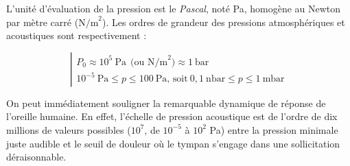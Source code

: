 
L'unité d'évaluation de la pression est le \emph{Pascal}, noté Pa,
homogène au Newton par mètre carré ($\mbox{N/m}^{2}$).
Les ordres de grandeur des pressions atmosphériques et acoustiques sont respectivement :

\vspace{-.75\baselineskip}
\begin{equation}
\left |
\begin{array}{l}
P_{0} \approx 10^{5} ~\mbox{Pa} ~~\mbox{(ou N/m}^{2}) \approx 1 ~\mbox{bar} \\[1ex]
10^{-5} ~\mbox{Pa} \leq p \leq 100 ~\mbox{Pa} \mbox{, soit} ~ 0,1~\mbox{nbar} \leq p \leq 1~\mbox{mbar}
\end{array}
\right.
\label{eq:V.2}
\end{equation}
\vspace{-.75\baselineskip}

On peut immédiatement souligner la remarquable dynamique de réponse de l'oreille humaine. En effet, l'échelle de pression acoustique est de l'ordre de dix millions de valeurs possibles ($10^{7}$, de $10^{-5}$ à $10^{2}$ Pa) entre la pression minimale juste audible et le seuil de douleur où le tympan s'engage dans une sollicitation déraisonnable.

